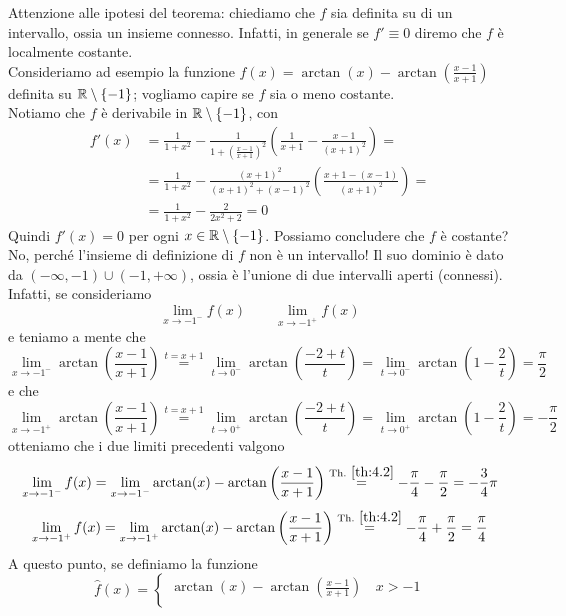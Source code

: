 \begin{remark}
    Attenzione alle ipotesi del teorema: chiediamo che $f$ sia definita su di un intervallo, ossia un insieme connesso. Infatti, in generale se $f'\equiv 0$ diremo che $f$ è localmente costante.\\
    Consideriamo ad esempio la funzione $f(x)=\arctan(x)-\arctan\left(\frac{x-1}{x+1}\right)$ definita su $\amsbb{R}\setminus\{-1\}$; vogliamo capire se $f$ sia o meno costante.\\
    Notiamo che $f$ è derivabile in $\amsbb{R}\setminus\{-1\}$, con
    \[
    \begin{split}
        f'(x) &= \frac{1}{1+x^2}-\frac{1}{1+\left(\frac{x-1}{x+1}\right)^2}\left(\frac{1}{x+1}-\frac{x-1}{(x+1)^2}\right) = \\
        & = \frac{1}{1+x^2}-\frac{(x+1)^2}{(x+1)^2+(x-1)^2}\left(\frac{x+1-(x-1)}{(x+1)^2}\right) = \\
        & = \frac{1}{1+x^2}-\frac{2}{2x^2+2} = 0
    \end{split}
    \]
    Quindi $f'(x)=0$ per ogni $x\in\amsbb{R}\setminus\{-1\}$. Possiamo concludere che $f$ è costante? No, perché l'insieme di definizione di $f$ non è un intervallo! Il suo dominio è dato da $(-\infty, -1)\cup(-1, +\infty)$, ossia è l'unione di due intervalli aperti (connessi).\\
    Infatti, se consideriamo 
    \[
    \lim_{x\to -1^-} f(x) \qquad \lim_{x\to -1^+} f(x) 
    \]
    e teniamo a mente che
    \[
    \lim_{x\to-1^-} \arctan\left(\frac{x-1}{x+1}\right) \overset{t=x+1}{=} \lim_{t\to 0^-} \arctan\left(\frac{-2+t}{t}\right) = \lim_{t\to 0^-}\arctan\left(1-\frac{2}{t}\right) = \frac{\pi}{2}
    \]
    e che
    \[
    \lim_{x\to-1^+} \arctan\left(\frac{x-1}{x+1}\right) \overset{t=x+1}{=} \lim_{t\to 0^+} \arctan\left(\frac{-2+t}{t}\right) = \lim_{t\to 0^+}\arctan\left(1-\frac{2}{t}\right) = -\frac{\pi}{2}
    \]
    otteniamo che i due limiti precedenti valgono
    \[
    \lim_{x\to -1^-} f(x) = \lim_{x\to -1^-} \arctan(x)-\arctan\left(\frac{x-1}{x+1}\right) \overset{\text{Th.} \ \ref{th:4.2}}{=} -\frac{\pi}{4}-\frac{\pi}{2} = -\frac{3}{4}\pi
    \]
    \[
    \lim_{x\to -1^+} f(x) = \lim_{x\to -1^+} \arctan(x)-\arctan\left(\frac{x-1}{x+1}\right) \overset{\text{Th.} \ \ref{th:4.2}}{=} -\frac{\pi}{4}+\frac{\pi}{2} = \frac{\pi}{4}
    \]
    A questo punto, se definiamo la funzione
    \[
    \widehat{f}(x)=\begin{cases}
        \arctan(x)-\arctan\left(\frac{x-1}{x+1}\right)\, & x>-1\\

\end{cases}\]
\end{remark}

